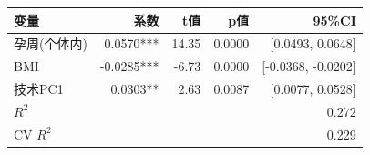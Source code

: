 \begin{tabular}{lrrrr}
\toprule
变量 & 系数 & t值 & p值 & 95\%CI \\
\midrule
孕周(个体内) & 0.0570*** & 14.35 & 0.0000 & [0.0493, 0.0648] \\
BMI & -0.0285*** & -6.73 & 0.0000 & [-0.0368, -0.0202] \\
技术PC1 & 0.0303** & 2.63 & 0.0087 & [0.0077, 0.0528] \\
\midrule
$R^2$ & \multicolumn{4}{r}{0.272} \\
CV $R^2$ & \multicolumn{4}{r}{0.229} \\
\bottomrule
\end{tabular}
